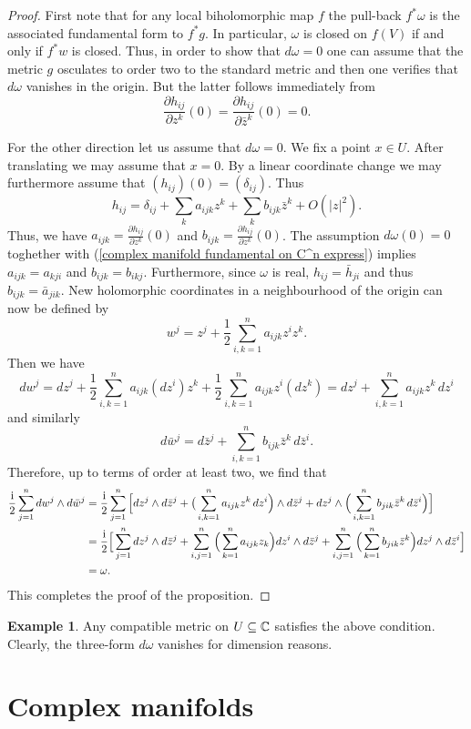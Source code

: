 \documentclass[11pt]{book}
\theoremstyle{definition}
\newtheorem{example}[theorem]{Example}
\begin{document}
\begin{proof}
First note that for any local biholomorphic map $f$ the pull-back $f^*\omega$ is the associated fundamental form to $f^*g$. In particular, $\omega$ is closed on $f(V)$ if and only if $f^*w$ is closed. Thus, in order to show that $d\omega=0$ one can assume that the metric $g$ osculates to order two to the standard metric and then one verifies that $d\omega$ vanishes in the origin. But the latter follows immediately from
\[\frac{\partial h_{ij}}{\partial z^k}(0)=\frac{\partial h_{ij}}{\partial\bar{z}^k}(0)=0.\]

For the other direction let us assume that $d\omega=0$. We fix a point $x\in U$. After translating we may assume that $x=0$. By a linear coordinate change we may furthermore assume that $(h_{ij})(0)=(\delta_{ij})$. Thus
\[h_{ij}=\delta_{ij}+\sum_ka_{ijk}z^k+\sum_kb_{ijk}\bar{z}^k+O(|z|^2).\]
Thus, we have $a_{ijk}=\frac{\partial h_{ij}}{\partial z^k}(0)$ and $b_{ijk}=\frac{\partial h_{ij}}{\partial z^k}(0)$. The assumption $d\omega(0)=0$ toghether with (\ref{complex manifold fundamental on C^n express}) implies $a_{ijk}=a_{kji}$ and $b_{ijk}=b_{ikj}$. Furthermore, since $\omega$ is real, $h_{ij}=\bar{h}_{ji}$ and thus $b_{ijk}=\bar{a}_{jik}$. New holomorphic coordinates in a neighbourhood of the origin can now be defined by
\[w^j=z^j+\frac{1}{2}\sum_{i,k=1}^{n}a_{ijk}z^iz^k.\]
Then we have
\[dw^j=dz^j+\frac{1}{2}\sum_{i,k=1}^{n}a_{ijk}(dz^i)z^k+\frac{1}{2}\sum_{i,k=1}^{n}a_{ijk}z^i(dz^k)=dz^j+\sum_{i,k=1}^{n}a_{ijk}z^k\,dz^i\]
and similarly
\[d\bar{w}^j=d\bar{z}^j+\sum_{i,k=1}^{n}b_{ijk}\bar{z}^k\,d\bar{z}^i.\]
Therefore, up to terms of order at least two, we find that
\begin{align*}
\frac{\mathrm{i}}{2}\sum_{j=1}^{n}dw^j\wedge d\bar{w}^j&=\frac{\mathrm{i}}{2}\sum_{j=1}^{n}\Big[dz^j\wedge d\bar{z}^j+\big(\sum_{i,k=1}^{n}a_{ijk}z^k\,dz^i\Big)\wedge d\bar{z}^j+dz^j\wedge\Big(\sum_{i,k=1}^{n}b_{jik}\bar{z}^k\,d\bar{z}^i\Big)\Big]\\
&=\frac{\mathrm{i}}{2}\Big[\sum_{j=1}^{n}dz^j\wedge d\bar{z}^j+\sum_{i,j=1}^{n}\Big(\sum_{k=1}^{n}a_{ijk}z_k\Big)dz^i\wedge d\bar{z}^j+\sum_{i,j=1}^{n}\Big(\sum_{k=1}^{n}b_{jik}\bar{z}^k\Big)dz^j\wedge d\bar{z}^i\Big]\\
&=\omega.
\end{align*}
This completes the proof of the proposition.
\end{proof}
\begin{example}
Any compatible metric on $U\subseteq\mathbb{C}$ satisfies the above condition. Clearly, the three-form $d\omega$ vanishes for dimension reasons.
\end{example}
\section{Complex manifolds}
\end{document}
